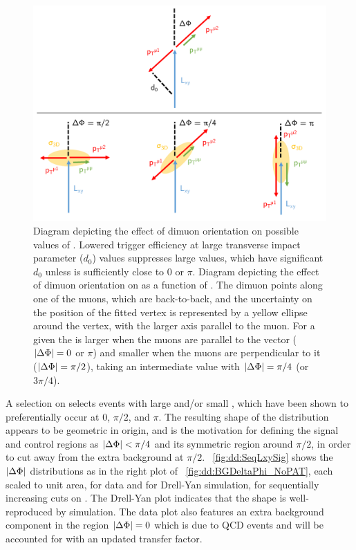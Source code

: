 \begin{figure}[htpb]
  \centering
  \includegraphics[width=1.2\DFigWidth]{figures/displaced/BGEST_WavyExplanationDiagram.pdf}
  \caption[Diagrams depicting the effect of dimuon orientation on possible values of \Lxy and \LxyErr.]{ Diagram depicting the effect of dimuon orientation on possible values of \Lxy. Lowered trigger efficiency at large transverse impact parameter ($d_0$) values suppresses large \Lxy values, which have significant $d_0$ unless \DeltaPhi is sufficiently close to 0 or $\pi$.  Diagram depicting the effect of dimuon orientation on \LxyErr as a function of \DeltaPhi. The dimuon \pT points along one of the muons, which are back-to-back, and the uncertainty on the position of the fitted vertex is represented by a yellow ellipse around the vertex, with the larger axis parallel to the muon. For a given \Lxy the \LxyErr is larger when the muons are parallel to the \Lxy vector (\ie $|\Delta\Phi| = 0$ or $\pi$) and smaller when the muons are perpendicular to it (\ie $|\Delta\Phi| = \pi/2$), taking an intermediate value with $|\Delta\Phi| = \pi/4$ (or $3\pi/4$).}
  \label{fig:dd:BGEST_WavyExplanationDiagram}
\end{figure}

A selection on \LxySig selects events with large \Lxy and/or small \LxyErr, which have been shown to preferentially occur at 0, $\pi/2$, and $\pi$.
The resulting shape of the \DeltaPhi distribution appears to be geometric in origin, and is the motivation for defining the signal and control regions as $|\Delta\Phi| < \pi/4$ and its symmetric region around $\pi/2$, in order to cut away from the extra background at $\pi/2$.
\Fig~\ref{fig:dd:SeqLxySig} shows the $|\Delta\Phi|$ distributions as in the right plot of \Fig~\ref{fig:dd:BGDeltaPhi_NoPAT}, each scaled to unit area, for data and for Drell-Yan simulation, for sequentially increasing cuts on \LxySig.
The Drell-Yan plot indicates that the shape is well-reproduced by simulation.
The data plot also features an extra background component in the region $|\Delta\Phi| = 0$ which is due to QCD events and will be accounted for with an updated transfer factor.

